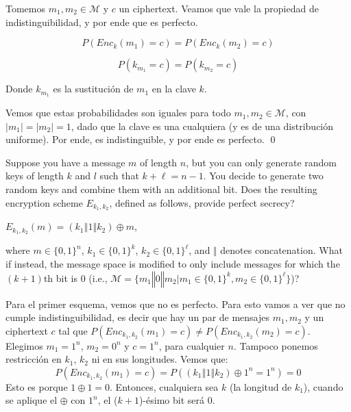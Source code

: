 \documentclass[12pt,addpoints,answers]{exam}
\begin{document}
\begin{questions}
\begin{parts}
\begin{solution}
        Tomemos $m_1, m_2 \in \mathcal{M}$ y $c$ un ciphertext. Veamos que vale la propiedad de indistinguibilidad, y por ende que es perfecto.

        \[
            P(Enc_k(m_1) = c) = P(Enc_k(m_2) = c)
        \]

        \[
            P(k_{m_1} = c) = P(k_{m_2} = c)
        \]
        
        Donde $k_{m_1}$ es la sustitución de $m_1$ en la clave $k$.

        Vemos que estas probabilidades son iguales para todo $m_1, m_2 \in \mathcal{M}$, con $|m_1| = |m_2| = 1$, dado que la clave es una cualquiera (y es de una distribución uniforme). Por ende, es indistinguible, y por ende es perfecto.
        \qed

    \end{solution}
\end{parts}


\question[10] Suppose you have a message $m$ of length $n$, but you can only generate random keys of length $k$ and $l$ such that $k + \ell = n - 1$. You decide to generate two random keys and combine them with an additional bit. Does the resulting encryption scheme $E_{k_1,k_2}$, defined as follows, provide perfect secrecy?
\begin{center}
      $E_{k_1,k_2}(m) = (k_1\mathbin\Vert 1 \mathbin\Vert k_2) \oplus m$,
\end{center}
where $m \in \{0,1\}^n$, $k_1 \in \{0,1\}^k$, $k_2 \in \{0,1\}^\ell$, and $\Vert$ denotes concatenation. What if instead, the message space is modified to only include messages for which the $(k+1)$th bit is $0$ (i.e., $\mathcal{M}=\big\{m_1\mathbin\Vert0\mathbin\Vert m_2\mathbin\big\vert m_1\in\{0,1\}^k,m_2\in\{0,1\}^\ell\big\}$)?
\begin{solution}
    Para el primer esquema, vemos que no es perfecto. Para esto vamos a ver que no cumple indistinguibilidad, es decir que hay un par de mensajes $m_1, m_2$ y un ciphertext $c$ tal que $P(Enc_{k_1,k_2}(m_1) = c) \neq P(Enc_{k_1,k_2}(m_2) = c)$.
    Elegimos $m_1 = 1^n$, $m_2 = 0^n$ y $c = 1^n$, para cualquier $n$. Tampoco ponemos restricción en $k_1$, $k_2$ ni en sus longitudes. 
    Vemos que:
    \[
        P(Enc_{k_1,k_2}(m_1) = c) = P((k_1 \mathbin\Vert 1 \mathbin\Vert k_2) \oplus 1^n = 1^n) = 0
    \]
    Esto es porque $1 \oplus 1 = 0$. Entonces, cualquiera sea $k$ (la longitud de $k_1$), cuando se aplique el $\oplus$ con $1^n$, el ($k+1$)-ésimo bit será $0$. 


\end{solution}
\end{questions}
\end{document}
